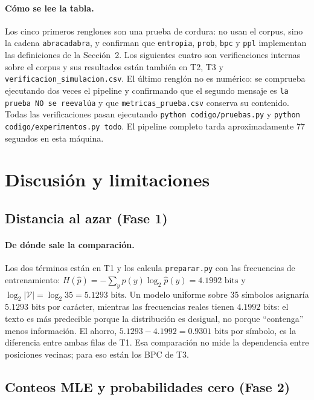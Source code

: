\documentclass[11pt,letterpaper]{article}
\begin{document}
	\paragraph{Cómo se lee la tabla.}
	Los cinco primeros renglones son una prueba de cordura: no usan el corpus, sino la cadena \texttt{abracadabra}, y confirman que \texttt{entropia}, \texttt{prob}, \texttt{bpc} y \texttt{ppl} implementan las definiciones de la Sección~2. Los siguientes cuatro son verificaciones internas sobre el corpus y sus resultados están también en T2, T3 y \texttt{verificacion\_simulacion.csv}. El último renglón no es numérico: se comprueba ejecutando dos veces el pipeline y confirmando que el segundo mensaje es \texttt{la prueba NO se reevalúa} y que \texttt{metricas\_prueba.csv} conserva su contenido. Todas las verificaciones pasan ejecutando \texttt{python codigo/pruebas.py} y \texttt{python codigo/experimentos.py todo}. El pipeline completo tarda aproximadamente 77 segundos en esta máquina.
	
	\section{Discusión y limitaciones}
	
	\subsection{Distancia al azar (Fase 1)}
	
	\paragraph{De dónde sale la comparación.}
	Los dos términos están en T1 y los calcula \texttt{preparar.py} con las frecuencias de entrenamiento: $H(\hat p) = -\sum_y \hat p(y) \log_2 \hat p(y) = 4.1992\text{ bits}$ y $\log_2 |\mathcal{V}| = \log_2 35 = 5.1293\text{ bits}$. Un modelo uniforme sobre 35 símbolos asignaría $5.1293\text{ bits}$ por carácter, mientras las frecuencias reales tienen $4.1992\text{ bits}$: el texto es más predecible porque la distribución es desigual, no porque ``contenga'' menos información. El ahorro, $5.1293 - 4.1992 = 0.9301\text{ bits}$ por símbolo, es la diferencia entre ambas filas de T1. Esa comparación no mide la dependencia entre posiciones vecinas; para eso están los BPC de T3.
	
	\subsection{Conteos MLE y probabilidades cero (Fase 2)}
	
\end{document}

